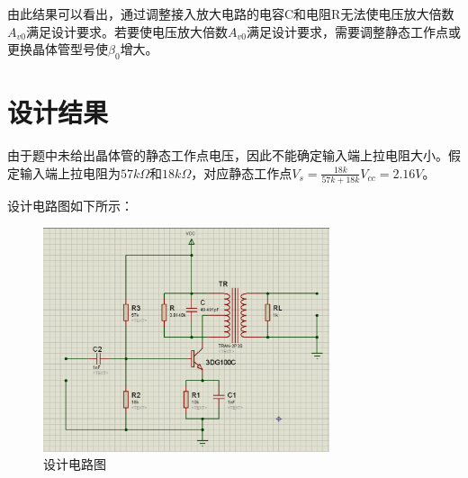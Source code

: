 \documentclass[a4paper]{ctexrep}
\begin{document}
\begin{spacing}{1.5}
由此结果可以看出，通过调整接入放大电路的电容C和电阻R无法使电压放大倍数$A_{v0}$满足设计要求。若要使电压放大倍数$A_{v0}$满足设计要求，需要调整静态工作点或更换晶体管型号使$\beta_{0}$增大。

\section{设计结果}
由于题中未给出晶体管的静态工作点电压，因此不能确定输入端上拉电阻大小。假定输入端上拉电阻为$57k\Omega$和$18k\Omega$，对应静态工作点$V_{s}=\frac{18k}{57k+18k}V_{cc}=2.16V$。

设计电路图如下所示：
\begin{figure}[htbp]
	\centering
	\includegraphics [width=0.75\textwidth]{figure//res.png}
	\caption{设计电路图}\label{remote1}
\end{figure}

\end{spacing}
\end{document}
